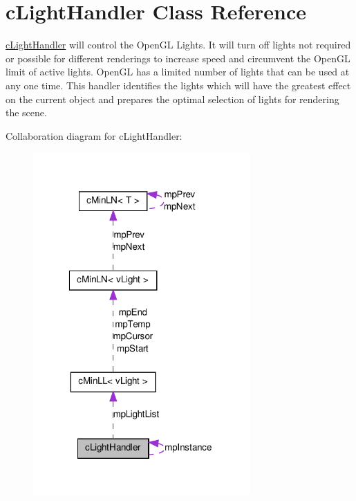 \hypertarget{classc_light_handler}{
\section{cLightHandler Class Reference}
\label{classc_light_handler}
}


\hyperlink{classc_light_handler}{cLightHandler} will control the OpenGL Lights. It will turn off lights not required or possible for different renderings to increase speed and circumvent the OpenGL limit of active lights. OpenGL has a limited number of lights that can be used at any one time. This handler identifies the lights which will have the greatest effect on the current object and prepares the optimal selection of lights for rendering the scene.  




Collaboration diagram for cLightHandler:\nopagebreak
\begin{figure}[H]
\begin{center}
\leavevmode
\includegraphics[width=235pt]{classc_light_handler__coll__graph}
\end{center}
\end{figure}
